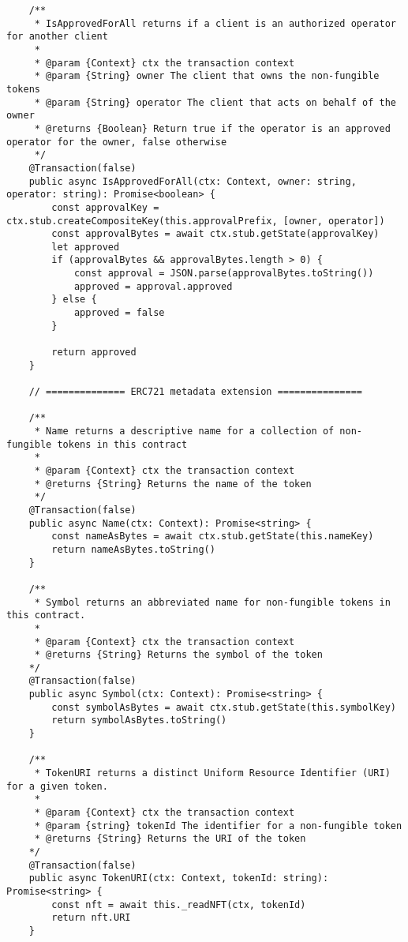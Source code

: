 \begin{lstlisting}
    /**
     * IsApprovedForAll returns if a client is an authorized operator for another client
     *
     * @param {Context} ctx the transaction context
     * @param {String} owner The client that owns the non-fungible tokens
     * @param {String} operator The client that acts on behalf of the owner
     * @returns {Boolean} Return true if the operator is an approved operator for the owner, false otherwise
     */
    @Transaction(false)
    public async IsApprovedForAll(ctx: Context, owner: string, operator: string): Promise<boolean> {
        const approvalKey = ctx.stub.createCompositeKey(this.approvalPrefix, [owner, operator])
        const approvalBytes = await ctx.stub.getState(approvalKey)
        let approved
        if (approvalBytes && approvalBytes.length > 0) {
            const approval = JSON.parse(approvalBytes.toString())
            approved = approval.approved
        } else {
            approved = false
        }

        return approved
    }

    // ============== ERC721 metadata extension ===============

    /**
     * Name returns a descriptive name for a collection of non-fungible tokens in this contract
     *
     * @param {Context} ctx the transaction context
     * @returns {String} Returns the name of the token
     */
    @Transaction(false)
    public async Name(ctx: Context): Promise<string> {
        const nameAsBytes = await ctx.stub.getState(this.nameKey)
        return nameAsBytes.toString()
    }

    /**
     * Symbol returns an abbreviated name for non-fungible tokens in this contract.
     *
     * @param {Context} ctx the transaction context
     * @returns {String} Returns the symbol of the token
    */
    @Transaction(false)
    public async Symbol(ctx: Context): Promise<string> {
        const symbolAsBytes = await ctx.stub.getState(this.symbolKey)
        return symbolAsBytes.toString()
    }

    /**
     * TokenURI returns a distinct Uniform Resource Identifier (URI) for a given token.
     *
     * @param {Context} ctx the transaction context
     * @param {string} tokenId The identifier for a non-fungible token
     * @returns {String} Returns the URI of the token
    */
    @Transaction(false)
    public async TokenURI(ctx: Context, tokenId: string): Promise<string> {
        const nft = await this._readNFT(ctx, tokenId)
        return nft.URI
    }


\end{lstlisting}
